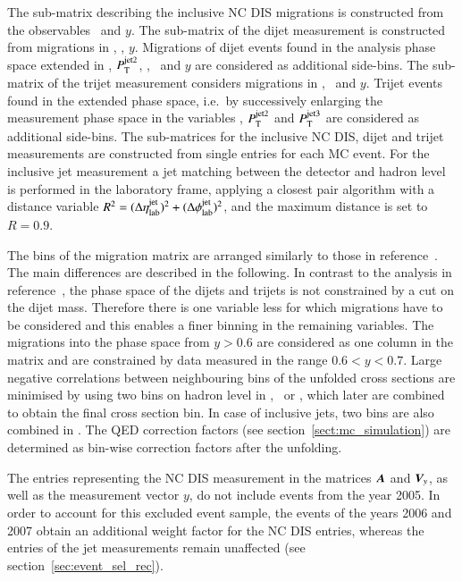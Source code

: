 \documentclass[12pt]{article}
\begin{document}
The sub-matrix describing the inclusive NC DIS migrations is constructed from the observables \Qsq\ and $y$.
The sub-matrix of the dijet measurement is constructed from migrations in \meanptdi, \Qsq, $y$. 
Migrations of dijet events found in the analysis phase space extended in \etalab, $P_{\rm T}^{\rm jet2}$, \meanptdi, \Qsq\ and $y$ are considered as additional side-bins.
The sub-matrix of the trijet measurement  considers migrations in \meanpttri, \Qsq\ and $y$.
Trijet events found in the extended phase space, i.e.\ by successively enlarging the measurement phase space in the variables \etalab, $P_{\rm T}^{\rm jet2}$ and $P_{\rm T}^{\rm jet3}$ are considered as additional side-bins.
The sub-matrices for the inclusive NC DIS, dijet and trijet measurements are constructed from single entries for each MC event.
For the inclusive jet measurement a jet matching between the detector and hadron level is performed in the laboratory frame, applying a closest pair algorithm with a distance variable $R^2=(\Delta\etalab)^2+(\Delta\phi_{\rm lab}^{\rm jet})^2$, and the maximum distance is set to $R=0.9$.

The bins of the migration matrix are arranged similarly to those in reference~\cite{H1Multijets}.
The main differences are described in the following.
In contrast to the analysis in reference~\cite{H1Multijets}, the phase space of the 
dijets and trijets is not constrained by a cut on the dijet mass.
Therefore there is one variable less for which migrations have to be considered 
and this enables a finer binning in the remaining variables.
The migrations into the phase space from $y>0.6$ are considered as one column 
in the matrix and are constrained by data measured in the range $0.6<y<0.7$.
Large negative correlations between neighbouring bins of the unfolded cross sections are minimised by using 
 two bins on hadron level in \ptjet, \meanptdi\ or \meanpttri, 
which later are combined to obtain the final cross section bin.
In case of inclusive jets, two bins are also combined in \etalab.
The QED correction factors (see section~\ref{sect:mc_simulation}) are determined as bin-wise correction factors after the unfolding.

The entries representing the NC DIS measurement in the matrices $\A$ and $\V_y$, as well as the measurement vector $y$,  
do not include events from the year 2005.
In order to account for this excluded event sample, 
the events of the years 2006 and 2007 obtain an additional
 weight factor for the NC DIS entries, whereas 
the entries of the jet measurements remain unaffected (see section~\ref{sec:event_sel_rec}). 
\end{document}
